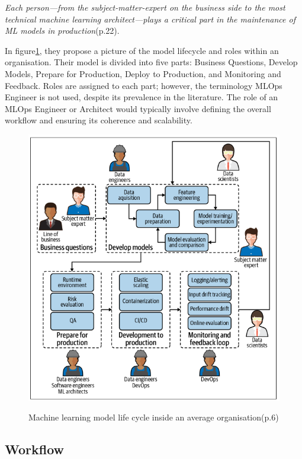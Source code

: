 \textit{Each person—from the subject-matter-expert on the business side to the most
technical machine learning architect—plays a critical part in the maintenance of ML
models in production}\cite{treveil2020introducing}(p.22).

In figure\ref{fig:mlop-people}, they propose a picture of the model lifecycle and roles within an organisation.
Their model is divided into five parts: Business Questions, Develop Models, Prepare for Production, Deploy to Production, and Monitoring and Feedback.
Roles are assigned to each part; however, the terminology MLOps Engineer is not used, despite its prevalence in the literature\cite{Kreuzberger2022MachineLO}.
The role of an MLOps Engineer or Architect would typically involve defining the overall workflow and ensuring its coherence and scalability.

\begin{figure}[!htbp]
    \caption{Machine learning model life cycle inside an average
    organisation\cite{treveil2020introducing}(p.6)}
    \centering
    \includegraphics[scale=0.3]{images/mlops-people}
    \label{fig:mlop-people}
\end{figure}

\subsection{Workflow}\label{subsec:workflow}

